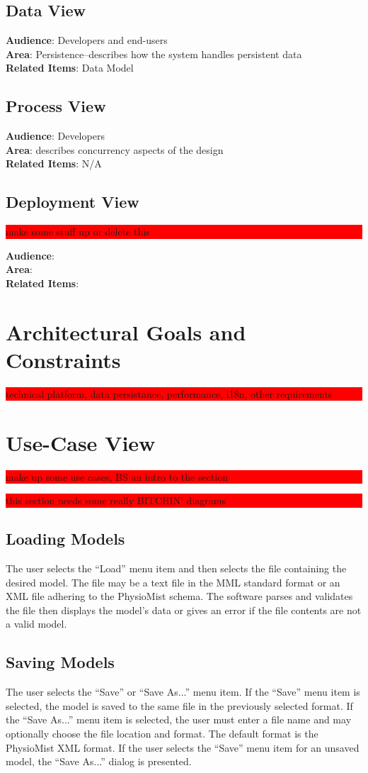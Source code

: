 \documentclass{article}
\newcommand{\todo}[1]{\colorbox{red}{\begin{minipage}{\textwidth}{#1}\end{minipage}}}
\begin{document}
\subsection{Data View}
\textbf{Audience}: Developers and end-users\\
\textbf{Area}: Persistence--describes how the system handles persistent data\\
\textbf{Related Items}: Data Model
\subsection{Process View}
\textbf{Audience}: Developers\\
\textbf{Area}: describes concurrency aspects of the design\\
\textbf{Related Items}: N/A
\subsection{Deployment View}
\todo{make some stuff up or delete this}
\textbf{Audience}:\\
\textbf{Area}:\\
\textbf{Related Items}:

\section{Architectural Goals and Constraints}
\todo{technical platform, data persistance, performance, i18n, other requirements}

\section{Use-Case View}
\todo{make up some use cases, BS an intro to the section}
\todo{this section needs some really BITCHIN' diagrams}
\subsection{Loading Models}
The user selects the ``Load'' menu item and then selects the file containing the desired model. The file may be a text file in the MML standard format or an XML file adhering to the PhysioMist schema. The software parses and validates the file then displays the model's data or gives an error if the file contents are not a valid model.
\subsection{Saving Models}
The user selects the ``Save'' or ``Save As...'' menu item. If the ``Save'' menu item is selected, the model is saved to the same file in the previously selected format. If the ``Save As...'' menu item is selected, the user must enter a file name and may optionally choose the file location and format. The default format is the PhysioMist XML format. If the user selects the ``Save'' menu item for an unsaved model, the ``Save As...'' dialog is presented.
\end{document}
